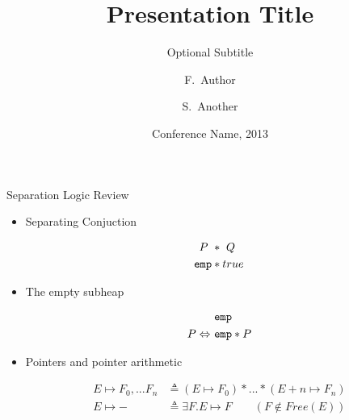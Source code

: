 \documentclass{beamer}
\title{Presentation Title}
\subtitle{Optional Subtitle}
\author{F.~Author\inst{1} \and S.~Another\inst{2}}
\institute[Universities of Somewhere and Elsewhere] %
{
  \inst{1}%
  Department of Computer Science\\
  University of Somewhere
  \and
  \inst{2}%
  Department of Theoretical Philosophy\\
  University of Elsewhere}
\date{Conference Name, 2013}
\newcommand{\btt}[1]{
  \mbox{\bm{$\mathtt{#1}$}}
}
\begin{document}
\setlength{\abovedisplayskip}{0pt}
\setlength{\belowdisplayskip}{0pt}
\setlength{\abovedisplayshortskip}{0pt}
\setlength{\belowdisplayshortskip}{0pt}

\begin{frame}{Separation Logic Review}
  \begin{itemize}
  \item {
    Separating Conjuction

    \begin{align*}
      \vspace*{-1cm}
      P\ & *\ Q\\
      \btt{emp} & * true
    \end{align*}
  }

  \item {
    The empty subheap

    \begin{align*}
      & \btt{emp} \\
      P \Leftrightarrow\ &\btt{emp} * P
    \end{align*}
  }

  \item{
    Pointers and pointer arithmetic

    \begin{align*}
      E \mapsto F_0,...F_n & \triangleq (E \mapsto F_0) * ... * (E + n \mapsto F_n)\\
      E \mapsto - & \triangleq \exists F.E \mapsto F \qquad (F \notin Free(E))
    \end{align*}
  }
  \end{itemize}
\end{frame}
\end{document}
